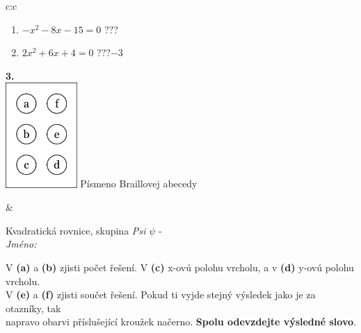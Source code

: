 \documentclass[10pt]{report}
\begin{document}
\begin{tabular}{c:c}
\begin{minipage}[c][104.5mm][t]{0.5\linewidth}
\begin{center}
\begin{minipage}{0.79\linewidth}
\begin{center}
\begin{varwidth}{\linewidth}
\begin{enumerate}
\item $-x^2-8x-15=0$\quad \dotfill\; ???\;\dotfill {}
\item $2x^2+6x+4=0$\quad \dotfill\; ???\;\dotfill \quad $-3$
\end{enumerate}
\end{varwidth}
\end{center}
\end{minipage}
\begin{minipage}{0.20\linewidth}
\begin{center}
{\Huge\bfseries 3.} \\[2mm]
\includegraphics[height=40mm]{../images/braille.png}
{\small Písmeno Braillovej abecedy}
\end{center}
\end{minipage}
\end{center}
\end{minipage}
&
\begin{minipage}[c][104.5mm][t]{0.5\linewidth}
\begin{center}
\vspace{7mm}
{\huge Kvadratická rovnice, skupina \textit{Psi $\psi$} -}\\[5mm]
\textit{Jméno:}\phantom{xxxxxxxxxxxxxxxxxxxxxxxxxxxxxxxxxxxxxxxxxxxxxxxxxxxxxxxxxxxxxxxxx}\\[5mm]
\begin{minipage}{0.95\linewidth}
\begin{center}
V \textbf{(a)} a \textbf{(b)} zjisti počet řešení. V \textbf{(c)} x-ovú polohu vrcholu, a v \textbf{(d)} y-ovú polohu vrcholu.\\V \textbf{(e)} a \textbf{(f)} zjisti součet řešení. Pokud ti vyjde stejný výsledek jako je za otazníky, tak\\napravo obarvi příslušející kroužek načerno. \textbf{Spolu odevzdejte výsledné slovo}.
\end{center}
\end{minipage}
\\[1mm]
\begin{minipage}{0.79\linewidth}
\begin{center}

\end{center}
\end{minipage}
\end{center}
\end{minipage}
\end{tabular}
\end{document}

